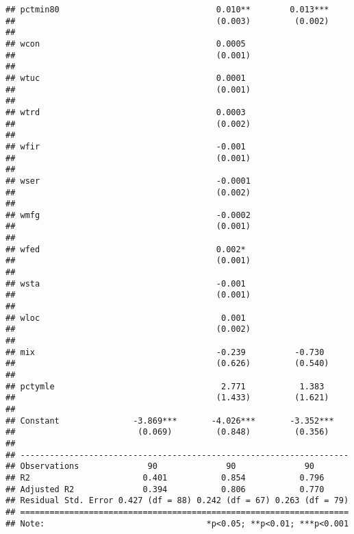 \documentclass[
]{article}
\begin{document}
\begin{verbatim}
## pctmin80                                0.010**        0.013***    
##                                         (0.003)         (0.002)    
##                                                                    
## wcon                                    0.0005                     
##                                         (0.001)                    
##                                                                    
## wtuc                                    0.0001                     
##                                         (0.001)                    
##                                                                    
## wtrd                                    0.0003                     
##                                         (0.002)                    
##                                                                    
## wfir                                    -0.001                     
##                                         (0.001)                    
##                                                                    
## wser                                    -0.0001                    
##                                         (0.002)                    
##                                                                    
## wmfg                                    -0.0002                    
##                                         (0.001)                    
##                                                                    
## wfed                                    0.002*                     
##                                         (0.001)                    
##                                                                    
## wsta                                    -0.001                     
##                                         (0.001)                    
##                                                                    
## wloc                                     0.001                     
##                                         (0.002)                    
##                                                                    
## mix                                     -0.239          -0.730     
##                                         (0.626)         (0.540)    
##                                                                    
## pctymle                                  2.771           1.383     
##                                         (1.433)         (1.621)    
##                                                                    
## Constant               -3.869***       -4.026***       -3.352***   
##                         (0.069)         (0.848)         (0.356)    
##                                                                    
## -------------------------------------------------------------------
## Observations              90              90              90       
## R2                       0.401           0.854           0.796     
## Adjusted R2              0.394           0.806           0.770     
## Residual Std. Error 0.427 (df = 88) 0.242 (df = 67) 0.263 (df = 79)
## ===================================================================
## Note:                                 *p<0.05; **p<0.01; ***p<0.001
\end{verbatim}
\end{document}
